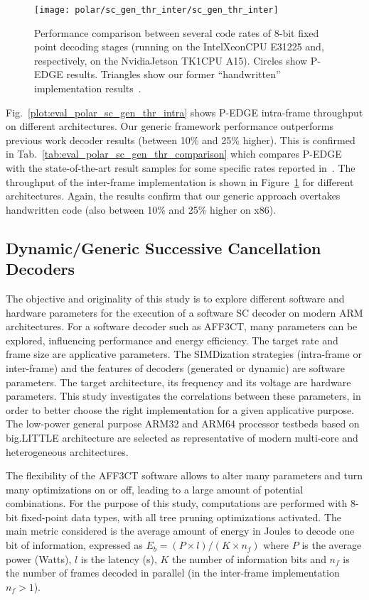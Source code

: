 \begin{figure}[htp]
  \texttt{[image: polar/sc\_gen\_thr\_inter/sc\_gen\_thr\_inter]}
  \caption{Performance comparison between several code rates of 8-bit fixed
    point decoding stages (running on the Intel\R Xeon\TM CPU E31225 and,
    respectively, on the Nvidia\R Jetson TK1\TM CPU A15). Circles show P-EDGE
    results. Triangles show our former ``handwritten'' implementation
    results~\cite{LeGal2015a}.}
  \label{plot:eval_polar_sc_gen_thr_inter}
\end{figure}

Fig.~\ref{plot:eval_polar_sc_gen_thr_intra} shows P-EDGE intra-frame throughput
on different architectures. Our generic framework performance outperforms
previous work decoder results (between 10\% and 25\% higher). This is confirmed
in Tab.~\ref{tab:eval_polar_sc_gen_thr_comparison} which compares P-EDGE with
the state-of-the-art result samples for some specific rates reported
in~\cite{Sarkis2014}. The throughput of the inter-frame implementation is shown
in Figure~\ref{plot:eval_polar_sc_gen_thr_inter} for different architectures.
Again, the results confirm that our generic approach overtakes handwritten code
(also between 10\% and 25\% higher on x86).

\subsection{Dynamic/Generic Successive Cancellation Decoders}

The objective and originality of this study is to explore different software and
hardware parameters for the execution of a software SC decoder on modern ARM
architectures. For a software decoder such as AFF3CT, many parameters can be
explored, influencing performance and energy efficiency. The target rate and
frame size are applicative parameters. The SIMDization strategies (intra-frame
or inter-frame) and the features of decoders (generated or dynamic) are software
parameters. The target architecture, its frequency and its voltage are hardware
parameters. This study investigates the correlations between these parameters,
in order to better choose the right implementation for a given applicative
purpose. The low-power general purpose ARM32 and ARM64 processor testbeds based
on big.LITTLE architecture are selected as representative of modern multi-core
and heterogeneous architectures.

The flexibility of the AFF3CT software allows to alter many parameters and turn
many optimizations on or off, leading to a large amount of potential
combinations. For the purpose of this study, computations are performed with
8-bit fixed-point data types, with all tree pruning optimizations activated. The
main metric considered is the average amount of energy in Joules to decode one
bit of information, expressed  as  $E_b = (P \times l) / (K \times n_f)$ where
$P$ is the average power (Watts), $l$ is the latency (s), $K$ the number of
information bits and $n_f$ is the number of frames decoded in parallel (in the
inter-frame implementation $n_f > 1$).

